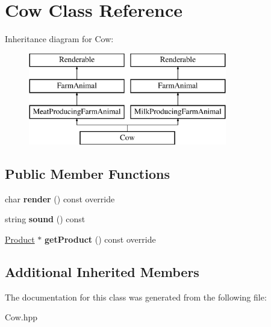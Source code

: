 \hypertarget{class_cow}{}\section{Cow Class Reference}
\label{class_cow}
Inheritance diagram for Cow\+:\begin{figure}[H]
\begin{center}
\leavevmode
\includegraphics[height=4.000000cm]{class_cow}
\end{center}
\end{figure}
\subsection*{Public Member Functions}
\begin{DoxyCompactItemize}
\item 
\mbox{\label{class_cow_abbe6d9b43db5fbf3f625476f5f77e1f3}} 
char {\bfseries render} () const override
\item 
\mbox{\label{class_cow_a90431a7ffa3e464fa4602b2aaba76a99}} 
string {\bfseries sound} () const
\item 
\mbox{\label{class_cow_aa8da6e5254ba73d3a13d05b7ede7f007}} 
\mbox{\hyperlink{class_product}{Product}} $\ast$ {\bfseries get\+Product} () const override
\end{DoxyCompactItemize}
\subsection*{Additional Inherited Members}


The documentation for this class was generated from the following file\+:\begin{DoxyCompactItemize}
\item 
Cow.\+hpp\end{DoxyCompactItemize}
